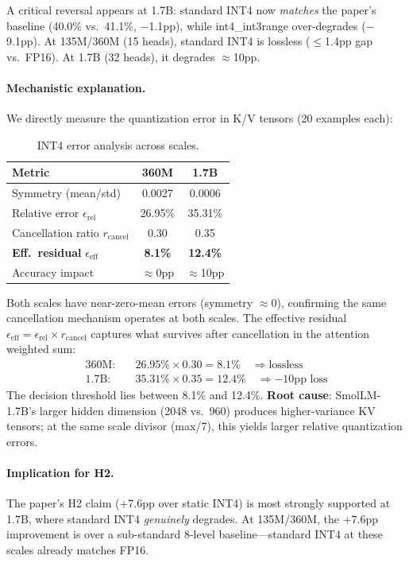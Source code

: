 \documentclass[10pt,twocolumn]{article}
\begin{document}
A critical reversal appears at 1.7B: standard INT4 now \emph{matches} the
paper's baseline (40.0\% vs.\ 41.1\%, $-$1.1pp), while int4\_int3range
over-degrades ($-$9.1pp).
At 135M/360M (15 heads), standard INT4 is lossless ($\leq$1.4pp gap vs.\
FP16).
At 1.7B (32 heads), it degrades $\approx$10pp.

\paragraph{Mechanistic explanation.}
We directly measure the quantization error in K/V tensors (20 examples each):

\begin{table}[h]
\centering
\caption{INT4 error analysis across scales.}
\label{tab:mech}
\footnotesize
\begin{tabular}{lcc}
\toprule
Metric & 360M & 1.7B \\
\midrule
Symmetry (mean/std) & 0.0027 & 0.0006 \\
Relative error $\epsilon_\text{rel}$ & 26.95\% & 35.31\% \\
Cancellation ratio $r_\text{cancel}$ & 0.30 & 0.35 \\
\textbf{Eff.\ residual} $\epsilon_\text{eff}$ & \textbf{8.1\%} & \textbf{12.4\%} \\
Accuracy impact & $\approx$0pp & $\approx$10pp \\
\bottomrule
\end{tabular}
\end{table}

Both scales have near-zero-mean errors (symmetry $\approx$0),
confirming the same cancellation mechanism operates at both scales.
The effective residual $\epsilon_\text{eff} = \epsilon_\text{rel} \times
r_\text{cancel}$ captures what survives after cancellation in the
attention weighted sum:
\begin{align*}
  \text{360M}: \quad & 26.95\% \times 0.30 = 8.1\% \quad \Rightarrow \text{lossless} \\
  \text{1.7B}: \quad & 35.31\% \times 0.35 = 12.4\% \quad \Rightarrow -10\text{pp loss}
\end{align*}
The decision threshold lies between 8.1\% and 12.4\%.
\textbf{Root cause}: SmolLM-1.7B's larger hidden dimension (2048 vs.\ 960)
produces higher-variance KV tensors; at the same scale divisor (max/7),
this yields larger relative quantization errors.

\paragraph{Implication for H2.}
The paper's H2 claim (+7.6pp over static INT4) is most strongly supported
at 1.7B, where standard INT4 \emph{genuinely} degrades.
At 135M/360M, the +7.6pp improvement is over a sub-standard 8-level
baseline—standard INT4 at these scales already matches FP16.
\end{document}
